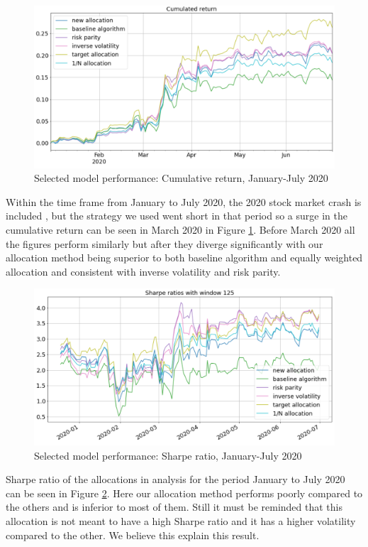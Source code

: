 \begin{figure}[H]
	\includegraphics[width=\textwidth]{cap5/selected_cum_ret_2020.png}
	\caption{Selected model performance: Cumulative return, January-July 2020}
	\label{fig:return_2020}
\end{figure}



Within the time frame from January to July 2020, the 2020 stock market crash is included , but the strategy we used went short in that period so a surge in the cumulative return can be seen in March 2020 in Figure \ref{fig:return_2020}. Before March 2020 all the figures perform similarly but after they diverge significantly with our allocation method being superior to both baseline algorithm and equally weighted allocation and consistent with inverse volatility and risk parity. \\

\begin{figure}[H]
	\includegraphics[width=\textwidth]{cap5/selected_sharpe_2020.png}
	\caption{Selected model performance: Sharpe ratio, January-July 2020}
	\label{fig:sharpe_2020}
\end{figure}



Sharpe ratio of the allocations in analysis for the period January to July 2020 can be seen in Figure \ref{fig:sharpe_2020}. Here our allocation method  performs poorly compared to the others and is inferior to most of them. Still it must be reminded that this allocation is not meant to have a high Sharpe ratio and it has a higher volatility compared to the other. We believe this explain this result.
